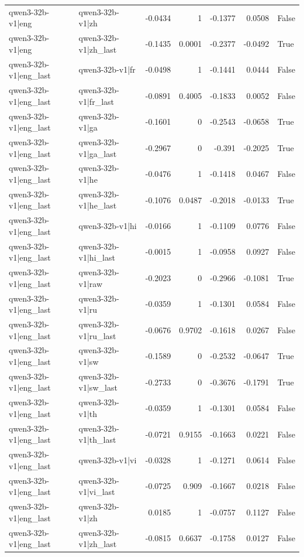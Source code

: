 \begin{table}
\begin{tabular}{l l r r r r l}
qwen3-32b-v1|eng & qwen3-32b-v1|zh & -0.0434 & 1 & -0.1377 & 0.0508 & False \\
qwen3-32b-v1|eng & qwen3-32b-v1|zh_last & -0.1435 & 0.0001 & -0.2377 & -0.0492 & True \\
qwen3-32b-v1|eng_last & qwen3-32b-v1|fr & -0.0498 & 1 & -0.1441 & 0.0444 & False \\
qwen3-32b-v1|eng_last & qwen3-32b-v1|fr_last & -0.0891 & 0.4005 & -0.1833 & 0.0052 & False \\
qwen3-32b-v1|eng_last & qwen3-32b-v1|ga & -0.1601 & 0 & -0.2543 & -0.0658 & True \\
qwen3-32b-v1|eng_last & qwen3-32b-v1|ga_last & -0.2967 & 0 & -0.391 & -0.2025 & True \\
qwen3-32b-v1|eng_last & qwen3-32b-v1|he & -0.0476 & 1 & -0.1418 & 0.0467 & False \\
qwen3-32b-v1|eng_last & qwen3-32b-v1|he_last & -0.1076 & 0.0487 & -0.2018 & -0.0133 & True \\
qwen3-32b-v1|eng_last & qwen3-32b-v1|hi & -0.0166 & 1 & -0.1109 & 0.0776 & False \\
qwen3-32b-v1|eng_last & qwen3-32b-v1|hi_last & -0.0015 & 1 & -0.0958 & 0.0927 & False \\
qwen3-32b-v1|eng_last & qwen3-32b-v1|raw & -0.2023 & 0 & -0.2966 & -0.1081 & True \\
qwen3-32b-v1|eng_last & qwen3-32b-v1|ru & -0.0359 & 1 & -0.1301 & 0.0584 & False \\
qwen3-32b-v1|eng_last & qwen3-32b-v1|ru_last & -0.0676 & 0.9702 & -0.1618 & 0.0267 & False \\
qwen3-32b-v1|eng_last & qwen3-32b-v1|sw & -0.1589 & 0 & -0.2532 & -0.0647 & True \\
qwen3-32b-v1|eng_last & qwen3-32b-v1|sw_last & -0.2733 & 0 & -0.3676 & -0.1791 & True \\
qwen3-32b-v1|eng_last & qwen3-32b-v1|th & -0.0359 & 1 & -0.1301 & 0.0584 & False \\
qwen3-32b-v1|eng_last & qwen3-32b-v1|th_last & -0.0721 & 0.9155 & -0.1663 & 0.0221 & False \\
qwen3-32b-v1|eng_last & qwen3-32b-v1|vi & -0.0328 & 1 & -0.1271 & 0.0614 & False \\
qwen3-32b-v1|eng_last & qwen3-32b-v1|vi_last & -0.0725 & 0.909 & -0.1667 & 0.0218 & False \\
qwen3-32b-v1|eng_last & qwen3-32b-v1|zh & 0.0185 & 1 & -0.0757 & 0.1127 & False \\
qwen3-32b-v1|eng_last & qwen3-32b-v1|zh_last & -0.0815 & 0.6637 & -0.1758 & 0.0127 & False \\

\end{tabular}
\end{table}
